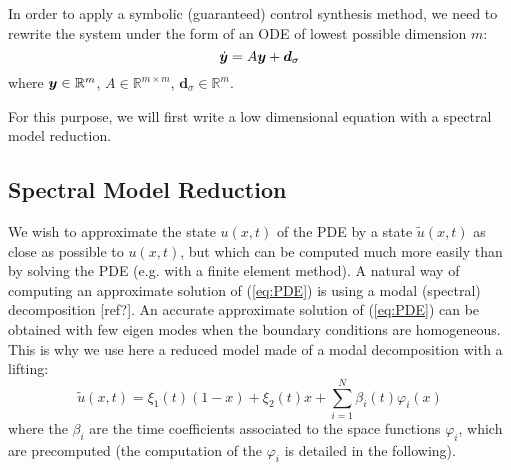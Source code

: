 % 

In order to apply a symbolic (guaranteed) control synthesis method, we need to rewrite the system
under the form of an ODE of lowest possible dimension $m$:
\begin{equation}
 \dot {\bm{y}} = A \bm{y} + \bm{d}_\sigma
 \label{eq:symbolic}
\end{equation}
where $\bm{y} \in \mathbb{R}^m$, $A \in \mathbb{R}^{m\times m}$, $\bm{d}_\sigma \in \mathbb{R}^m$.

For this purpose, we will first write a low dimensional equation with a 
spectral model reduction.
% 
% 
% 


\subsection{Spectral Model Reduction}
\label{sec:ROM}

We wish to approximate the state $u(x,t)$ of the PDE by a 
state $\tilde u (x,t)$ as close as possible to $u(x,t)$, 
but which can be computed much more easily than by solving the PDE (e.g. with a finite element
method). A natural way of computing an approximate solution 
of (\ref{eq:PDE}) is using a modal (spectral) decomposition [ref?].
An accurate approximate solution of (\ref{eq:PDE}) can be obtained with few 
eigen modes when the boundary conditions are homogeneous. This is why we 
use here a reduced model made of a modal decomposition with a lifting:
\begin{equation}
\tilde u(x,t) =  \xi_1(t)(1-x) + \xi_2(t)x + \sum_{i = 1}^N \beta_i (t) \varphi_i (x)
\label{eq:ROM}
\end{equation}
where the $\beta_i$ are the time coefficients associated to the space functions $\varphi_i$,
which are precomputed (the computation of the $\varphi_i$ is detailed in
the following). 

